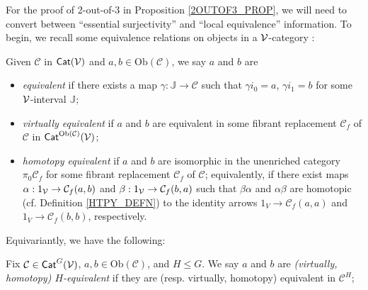 \documentclass[a4paper,10pt
,draft
]{article}%
\newcommand{\J}{\mathbb J}
\renewcommand{\1}{\ensuremath{\mathbb{id}}}
\begin{document}
For the proof of 2-out-of-3 in Proposition \ref{2OUTOF3_PROP}, we will need to convert between
``essential surjectivity'' and ``local equivalence'' information. 
To begin, we recall some equivalence relations on objects in a $\mathcal V$-category \cite{Cav14, BM13}:
\begin{definition}
      Given $\mathcal{C}$ in  $\mathsf{Cat}(\mathcal V)$ and $a,b\in\mathrm{Ob}(\mathcal C)$, we say $a$ and $b$ are
      \begin{itemize}
      \item {\em equivalent} if there exists a map $\gamma: \J \to \mathcal C$ such that
            $\gamma i_0 = a$, $\gamma i_1 = b$
            for some $\mathcal V$-interval $\J$;
      \item {\em virtually equivalent} if $a$ and $b$ are equivalent in some fibrant replacement
            $\mathcal C_f$ of $\mathcal C$ in $\mathsf{Cat}^{\mathrm{Ob}(\mathcal C)}(\mathcal V)$;
      \item {\em homotopy equivalent} if $a$ and $b$ are isomorphic in the unenriched category $\pi_0 \mathcal C_f$
            for some fibrant replacement $\mathcal C_f$ of $\mathcal C$;
            equivalently, if there exist maps
            $\alpha: 1_{\mathcal V} \to \mathcal C_f(a,b)$ and $\beta: 1_{\mathcal V}\to \mathcal C_f(b,a)$ such that
            $\beta\alpha$ and $\alpha\beta$ are homotopic (cf. Definition \ref{HTPY_DEFN})
            to the identity arrows
            $1_V\to \mathcal C_f(a,a)$ and $1_V \to \mathcal C_f(b,b)$, respectively.
      \end{itemize}
\end{definition}

Equivariantly, we have the following:
\begin{definition}
      Fix $\mathcal{C}\in \mathsf{Cat}^G(\mathcal V)$, $a,b\in \mathrm{Ob}(\mathcal{C})$, and $H \leq G$.
      We say $a$ and $b$ are 
      \textit{(virtually, homotopy) $H$-equivalent}
      if they are (resp. virtually, homotopy) equivalent in $\mathcal{C}^H$;
\end{definition}
\end{document}
